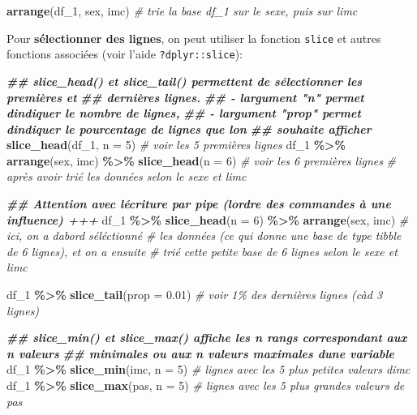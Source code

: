 \documentclass[
]{book}
\newenvironment{Shaded}{\begin{snugshade}}{\end{snugshade}}
\newcommand{\AttributeTok}[1]{\textcolor[rgb]{0.13,0.29,0.53}{#1}}
\newcommand{\CommentTok}[1]{\textcolor[rgb]{0.56,0.35,0.01}{\textit{#1}}}
\newcommand{\DecValTok}[1]{\textcolor[rgb]{0.00,0.00,0.81}{#1}}
\newcommand{\DocumentationTok}[1]{\textcolor[rgb]{0.56,0.35,0.01}{\textbf{\textit{#1}}}}
\newcommand{\FloatTok}[1]{\textcolor[rgb]{0.00,0.00,0.81}{#1}}
\newcommand{\FunctionTok}[1]{\textcolor[rgb]{0.13,0.29,0.53}{\textbf{#1}}}
\newcommand{\NormalTok}[1]{#1}
\newcommand{\SpecialCharTok}[1]{\textcolor[rgb]{0.81,0.36,0.00}{\textbf{#1}}}
\begin{document}
\begin{Shaded}
\begin{Highlighting}[]
\FunctionTok{arrange}\NormalTok{(df\_1, sex, imc) }\CommentTok{\# trie la base df\_1 sur le sexe, puis sur l\textquotesingle{}imc}
\end{Highlighting}
\end{Shaded}

Pour \textbf{sélectionner des lignes}, on peut utiliser la fonction \texttt{slice} et autres fonctions associées (voir l'aide \texttt{?dplyr::slice}):

\begin{Shaded}
\begin{Highlighting}[]
\DocumentationTok{\#\# slice\_head() et slice\_tail() permettent de sélectionner les premières et }
\DocumentationTok{\#\# dernières lignes. }
\DocumentationTok{\#\#   {-} l\textquotesingle{}argument "n" permet d\textquotesingle{}indiquer le nombre de lignes, }
\DocumentationTok{\#\#   {-} l\textquotesingle{}argument "prop" permet d\textquotesingle{}indiquer le pourcentage de lignes que l\textquotesingle{}on }
\DocumentationTok{\#\#     souhaite afficher}
\FunctionTok{slice\_head}\NormalTok{(df\_1, }\AttributeTok{n =} \DecValTok{5}\NormalTok{) }\CommentTok{\# voir les 5 premières lignes}
\NormalTok{df\_1 }\SpecialCharTok{\%\textgreater{}\%} \FunctionTok{arrange}\NormalTok{(sex, imc) }\SpecialCharTok{\%\textgreater{}\%} \FunctionTok{slice\_head}\NormalTok{(}\AttributeTok{n =} \DecValTok{6}\NormalTok{)  }\CommentTok{\# voir les 6 premières lignes}
\CommentTok{\# après avoir trié les données selon le sexe et l\textquotesingle{}imc}

\DocumentationTok{\#\# Attention avec l\textquotesingle{}écriture par pipe (l\textquotesingle{}ordre des commandes à une influence) +++ }
\NormalTok{df\_1 }\SpecialCharTok{\%\textgreater{}\%} \FunctionTok{slice\_head}\NormalTok{(}\AttributeTok{n =} \DecValTok{6}\NormalTok{) }\SpecialCharTok{\%\textgreater{}\%} \FunctionTok{arrange}\NormalTok{(sex, imc) }\CommentTok{\# ici, on a d\textquotesingle{}abord séléctionné}
\CommentTok{\# les données (ce qui donne une base de type tibble de 6 lignes), et on a ensuite}
\CommentTok{\# trié cette petite base de 6 lignes selon le sexe et l\textquotesingle{}imc}

\NormalTok{df\_1 }\SpecialCharTok{\%\textgreater{}\%} \FunctionTok{slice\_tail}\NormalTok{(}\AttributeTok{prop =} \FloatTok{0.01}\NormalTok{) }\CommentTok{\# voir 1\% des dernières lignes (càd 3 lignes)}

\DocumentationTok{\#\# slice\_min() et slice\_max() affiche les n rangs correspondant aux n valeurs }
\DocumentationTok{\#\# minimales ou aux n valeurs maximales d\textquotesingle{}une variable}
\NormalTok{df\_1 }\SpecialCharTok{\%\textgreater{}\%} \FunctionTok{slice\_min}\NormalTok{(imc, }\AttributeTok{n =} \DecValTok{5}\NormalTok{) }\CommentTok{\# lignes avec les 5 plus petites valeurs d\textquotesingle{}imc }
\NormalTok{df\_1 }\SpecialCharTok{\%\textgreater{}\%} \FunctionTok{slice\_max}\NormalTok{(pas, }\AttributeTok{n =} \DecValTok{5}\NormalTok{) }\CommentTok{\# lignes avec les 5 plus grandes valeurs de pas }


\end{Highlighting}
\end{Shaded}
\end{document}

